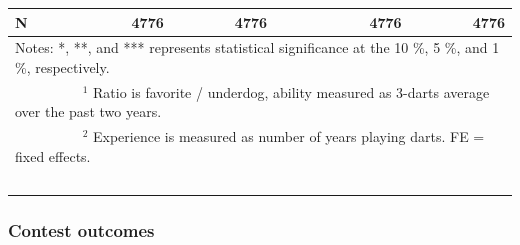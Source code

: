 \documentclass[11pt,a4paper]{article}
\begin{document}
\begin{table}[H]
\begin{tabular}{l r r r r r}
			\midrule 
            N                          &   4776    &   4776     & &   4776     &    4776     \\ 
			\bottomrule \bottomrule
			\multicolumn{6}{l}{\footnotesize Notes: *, **, and *** represents statistical significance at the 10 \%, 5 \%, and 1 \%, respectively. }\\
			\multicolumn{6}{l}{\footnotesize ~~~~~~~~~ $^{1}$ Ratio is favorite / underdog, ability measured as 3-darts average over the past two years. }\\
			\multicolumn{6}{l}{\footnotesize ~~~~~~~~~ $^{2}$ Experience is measured as number of years playing darts. FE = fixed effects.}\\
			\multicolumn{6}{l}{\footnotesize ~~~~~~~~~ }
		\end{tabular}
	\end{table}

\subsubsection{Contest outcomes}
\end{document}
